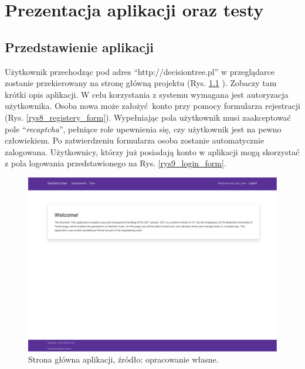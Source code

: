 \chapter{Prezentacja aplikacji oraz testy}
\section{Przedstawienie aplikacji}
Użytkownik przechodząc pod adres \enquote{http://decisiontree.pl} w przeglądarce zostanie przekierowany na stronę główną projektu (Rys. \ref{rys7_home_page} ). Zobaczy tam krótki opis aplikacji. W celu korzystania z systemu wymagana jest autoryzacja użytkownika. Osoba nowa może założyć konto przy pomocy formularza rejestracji (Rys. \ref{rys8_registery_form}). Wypełniając pola użytkownik musi zaakceptować pole \enquote{\textit{recaptcha}}, pełniące role upewnienia się, czy użytkownik jest na pewno człowiekiem. Po zatwierdzeniu formularza osoba zostanie automatycznie zalogowana. Użytkownicy, którzy już posiadają konto w aplikacji mogą skorzystać z pola logowania przedstawionego na Rys. \ref{rys9_login_form}.

\begin{figure}[htb]
	\centering
	\includegraphics[width=15cm]{grafika/home_page.eps}
	\caption{Strona główna aplikacji, źródło: opracowanie własne.}
	\label{rys7_home_page}
\end{figure}

